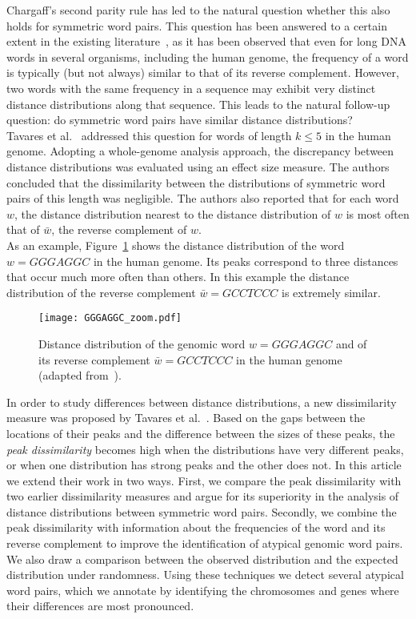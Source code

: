\documentclass[review,12pt]{elsarticle}
\begin{document}
Chargaff's second parity rule has led to the natural
question whether this also holds for symmetric
word pairs.
This question has been answered to a certain extent
in the existing literature~\cite{afreixo2013breakdown,afreixo2015analysis,albrecht2006,baisnee2002}, as it has been observed
that even for long DNA words in several organisms,
including the human genome, the frequency of a
word is typically (but not always) similar to
that of its reverse complement.
However, two words with the same frequency in a
sequence may exhibit very distinct distance
distributions along that sequence. This leads to
the natural follow-up question: do symmetric word
pairs have similar distance distributions?\\

Tavares et al.~\cite{Tavares2015} addressed
this question for words of length $k \leq 5$
in the human genome. Adopting a whole-genome
analysis approach, the discrepancy between distance
distributions was evaluated using an effect
size measure. The authors concluded that the
dissimilarity between the distributions of symmetric word pairs of
this length was negligible. The authors also
reported that for each word $w$, the distance
distribution nearest to the distance distribution of
$w$ is most often that of $\bar{w}$, the
reverse complement of $w$.\\

As an example, Figure~\ref{fig:example} shows
the distance distribution of the word
$w=GGGAGGC$ in the human genome.
Its peaks correspond to three distances that
occur much more often than others.
In this example the distance distribution of the
reverse complement $\bar{w}=GCCTCCC$ is
extremely similar.

\begin{figure}[htbp]
\centering
  \texttt{[image: GGGAGGC\_zoom.pdf]}	
\caption{Distance distribution of the genomic word
  $w=GGGAGGC$ and of its reverse complement
	$\bar{w}=GCCTCCC$ in the human genome (adapted from~\cite{Tavares2015}).}
\label{fig:example}
\end{figure}

In order to study differences between distance
distributions, a new dissimilarity measure was
proposed by Tavares et al.~\cite{tavares2017pacbb}. Based on
the gaps between the locations of their peaks
and the difference between the sizes of these
peaks, the {\it peak dissimilarity} becomes
high when the distributions have very different
peaks, or when one distribution has strong
peaks and the other does not.
In this article we extend their work in two ways.
First, we compare the peak dissimilarity with
two earlier dissimilarity measures and argue
for its superiority in the analysis of distance
distributions between symmetric word pairs.
Secondly, we combine the peak dissimilarity with
information about the frequencies of the word
and its reverse complement to improve the
identification of atypical genomic word pairs.
We also draw a comparison between the observed
distribution and the expected distribution
under randomness. Using these techniques we
detect several atypical word pairs, which
we annotate by identifying the chromosomes
and genes where their differences are most
pronounced.\\
\end{document}
